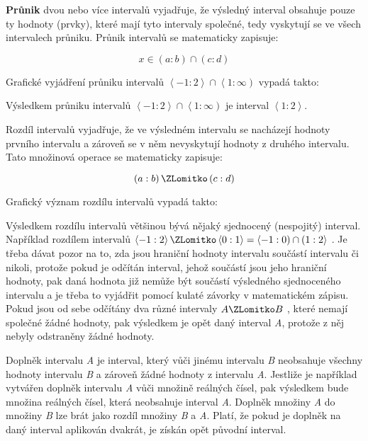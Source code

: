 
{\bf Průnik} dvou nebo více intervalů vyjadřuje, že výsledný interval obsahuje pouze ty hodnoty (prvky), které mají tyto intervaly společné, tedy vyskytují se ve všech intervalech průniku. Průnik intervalů se matematicky zapisuje:

$$ x \in (a:b) \cap (c:d) $$

Grafické vyjádření průniku intervalů $ \left< -1:2\right> \cap \left< 1: \infty\right) $ vypadá takto:

\vskip 4mm
\centerline{}
\vskip 4mm

Výsledkem průniku intervalů $ \left< -1:2\right> \cap \left< 1: \infty\right) $ je interval $ \left< 1:2 \right> $.


Rozdíl intervalů vyjadřuje, že ve výsledném intervalu se nacházejí hodnoty prvního intervalu a zároveň se v něm nevyskytují hodnoty z druhého intervalu. Tato množinová operace se matematicky zapisuje:

$$ \left(a : b \right) \ZLomitko \left( c:d \right)$$

Grafický význam rozdílu intervalů vypadá takto:

\vskip 4mm
\centerline{}
\vskip 4mm

Výsledkem rozdílu intervalů většinou bývá nějaký sjednocený (nespojitý) interval. Například rozdílem intervalů $\left< -1:2 \right> \ZLomitko \left< 0:1 \right> = \left< -1:0 \right) \cap  \left( 1:2 \right>$ . Je třeba dávat pozor na to, zda jsou hraniční hodnoty intervalu součástí intervalu či nikoli, protože pokud je odčítán interval, jehož součástí jsou jeho hraniční hodnoty, pak daná hodnota již nemůže být součástí výsledného sjednoceného intervalu a je třeba to vyjádřit pomocí kulaté závorky v matematickém zápisu. Pokud jsou od sebe odčítány dva různé intervaly $A \ZLomitko B$ , které nemají společné žádné hodnoty, pak výsledkem je opět daný interval {\it A}, protože z něj nebyly odstraněny žádné hodnoty.


Doplněk intervalu {\it A} je interval, který vůči jinému intervalu {\it B} neobsahuje všechny hodnoty intervalu {\it B} a zároveň žádné hodnoty z intervalu {\it A}. Jestliže je například vytvářen doplněk intervalu {\it A} vůči množině reálných čísel, pak výsledkem bude množina reálných čísel, která neobsahuje interval {\it A}. Doplněk množiny {\it A} do množiny {\it B} lze brát jako rozdíl množiny {\it B} a {\it A}. Platí, že pokud je doplněk na daný interval aplikován dvakrát, je získán opět původní interval.

